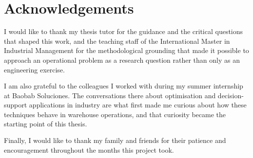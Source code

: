 \chapter*{Acknowledgements}

I would like to thank my thesis tutor for the guidance and the critical questions that shaped
this work, and the teaching staff of the International Master in Industrial Management for the
methodological grounding that made it possible to approach an operational problem as a research
question rather than only as an engineering exercise.

I am also grateful to the colleagues I worked with during my summer internship at Baobab
Soluciones. The conversations there about optimisation and decision-support applications in
industry are what first made me curious about how these techniques behave in warehouse
operations, and that curiosity became the starting point of this thesis.

Finally, I would like to thank my family and friends for their patience and encouragement
throughout the months this project took.
